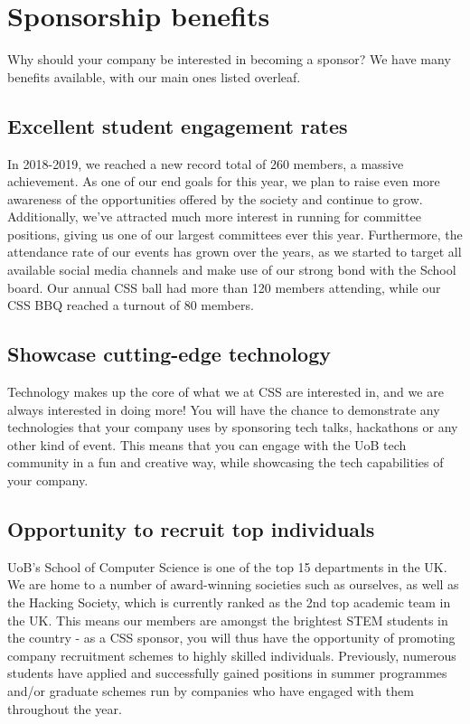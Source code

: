 \documentclass{article}
\begin{document}
\section*{Sponsorship benefits}

Why should your company be interested in becoming a sponsor?
We have many benefits available, with our main ones listed overleaf.

\newpage

\subsection*{Excellent student engagement rates}

In 2018-2019, we reached a new record total of 260 members, a massive achievement. As one of our end goals for this year, we plan to raise even more awareness of the opportunities offered by the society and continue to grow.
Additionally, we've attracted much more interest in running for committee positions, giving us one of our largest committees ever this year.
Furthermore, the attendance rate of our events has grown over the years, as we started to target all available social media channels and make use of our strong bond with the School board. 
Our annual CSS ball had more than 120 members attending, while our CSS BBQ reached a turnout of 80 members.

\subsection*{Showcase cutting-edge technology}

Technology makes up the core of what we at CSS are interested in, and we are always interested in doing more!
You will have the chance to demonstrate any technologies that your company uses by sponsoring tech talks, hackathons or any other kind of event.
This means that you can engage with the UoB tech community in a fun and creative way, while showcasing the tech capabilities of your company.

\subsection*{Opportunity to recruit top individuals}

UoB’s School of Computer Science is one of the top 15 departments in the UK. We are home to a number of award-winning societies such as ourselves, as well as the Hacking Society, which is currently ranked as the 2nd top academic team in the UK.
This means our members are amongst the brightest STEM students in the country - as a CSS sponsor, you will thus have the opportunity of promoting company recruitment schemes to highly skilled individuals.
Previously, numerous students have applied and successfully gained positions in summer programmes and/or graduate schemes run by companies who have engaged with them throughout the year. 
\end{document}
